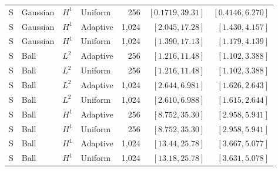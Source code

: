 \begin{longtable}{@{}llllrrr@{}}
S & Gaussian & $H^1$ & Uniform & 256 & $[0.1719,39.31]$ & $[0.4146,6.270]$ \\
S & Gaussian & $H^1$ & Adaptive & 1,024 & $[2.045,17.28]$ & $[1.430,4.157]$ \\
S & Gaussian & $H^1$ & Uniform & 1,024 & $[1.390,17.13]$ & $[1.179,4.139]$ \\
S & Ball & $L^2$ & Adaptive & 256 & $[1.216,11.48]$ & $[1.102,3.388]$ \\
S & Ball & $L^2$ & Uniform & 256 & $[1.216,11.48]$ & $[1.102,3.388]$ \\
S & Ball & $L^2$ & Adaptive & 1,024 & $[2.644,6.981]$ & $[1.626,2.643]$ \\
S & Ball & $L^2$ & Uniform & 1,024 & $[2.610,6.988]$ & $[1.615,2.644]$ \\
S & Ball & $H^1$ & Adaptive & 256 & $[8.752,35.30]$ & $[2.958,5.941]$ \\
S & Ball & $H^1$ & Uniform & 256 & $[8.752,35.30]$ & $[2.958,5.941]$ \\
S & Ball & $H^1$ & Adaptive & 1,024 & $[13.44,25.78]$ & $[3.667,5.077]$ \\
S & Ball & $H^1$ & Uniform & 1,024 & $[13.18,25.78]$ & $[3.631,5.078]$ \\
\bottomrule
\end{longtable}
